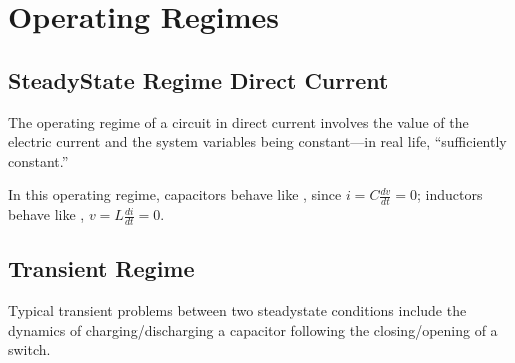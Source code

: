 \documentclass[letterpaper,10pt,english]{jupyterBook}
\begin{document}
\section{Operating Regimes}
\label{\detokenize{ch/circuits-electric-regimes:operating-regimes}}\label{\detokenize{ch/circuits-electric-regimes:classical-electromagnetism-circuits-electric-regimes}}\label{\detokenize{ch/circuits-electric-regimes::doc}}
\sphinxAtStartPar
{}

\sphinxAtStartPar
{}

\sphinxAtStartPar
{}


\subsection{Steady\sphinxhyphen{}State Regime \sphinxhyphen{} Direct Current}
\label{\detokenize{ch/circuits-electric-regimes:steady-state-regime-direct-current}}\label{\detokenize{ch/circuits-electric-regimes:physics-hs-electromagnetism-circuits-electric-regimes-dc}}
\sphinxAtStartPar
The operating regime of a circuit in direct current involves the value of the electric current and the system variables being constant—in real life, “sufficiently constant.”

\sphinxAtStartPar
In this operating regime, capacitors behave like {\hyperref[\detokenize{ch/circuits-electric-elementary-connections:physics-hs-electromagnetism-circuits-electric-circuits-open}]{}}, since \(i = C \frac{dv}{dt} = 0\); inductors behave like {\hyperref[\detokenize{ch/circuits-electric-elementary-connections:physics-hs-electromagnetism-circuits-electric-circuits-short}]{}}, \(v = L \frac{d i}{d t} = 0\).


\subsection{Transient Regime}
\label{\detokenize{ch/circuits-electric-regimes:transient-regime}}\label{\detokenize{ch/circuits-electric-regimes:physics-hs-electromagnetism-circuits-electric-regimes-dt}}
\sphinxAtStartPar
Typical transient problems between two steady\sphinxhyphen{}state conditions include the dynamics of charging/discharging a capacitor following the closing/opening of a switch.

\sphinxAtStartPar
{} 
\end{document}

